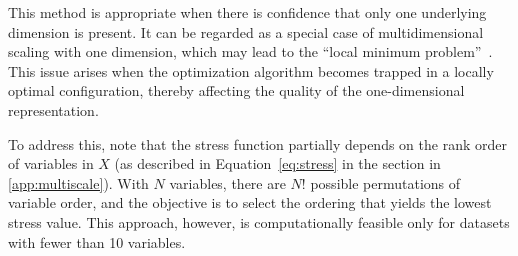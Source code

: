 
This method is appropriate when there is confidence that only one underlying dimension is present. It can be regarded as a special case of multidimensional scaling with one dimension, which may lead to the ``local minimum problem''~\citep{mair2015unidimensional}. This issue arises when the optimization algorithm becomes trapped in a locally optimal configuration, thereby affecting the quality of the one-dimensional representation.

To address this, \citet{mair2015unidimensional} note that the stress function partially depends on the rank order of variables in $X$ (as described in Equation~\ref{eq:stress} in the section in \ref{app:multiscale}). With $N$ variables, there are $N!$ possible permutations of variable order, and the objective is to select the ordering that yields the lowest stress value. This approach, however, is computationally feasible only for datasets with fewer than 10 variables.
